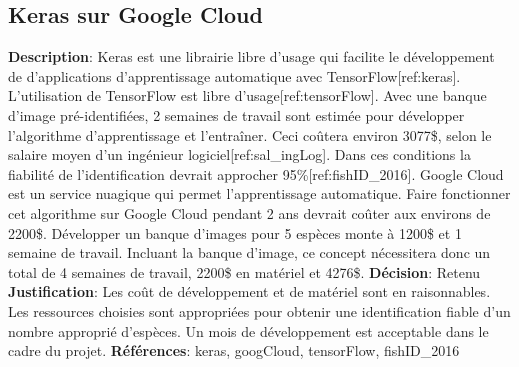 

\subsection{Keras sur Google Cloud}
\label{s:identifier_conc4}

\textbf{Description}: Keras est une librairie libre d’usage qui facilite le développement de d’applications d’apprentissage automatique avec TensorFlow[ref:keras].  L’utilisation de TensorFlow est libre d’usage[ref:tensorFlow]. Avec une banque d’image pré-identifiées, 2 semaines de travail sont estimée pour développer l'algorithme d’apprentissage et l’entraîner. Ceci coûtera environ 3077\$, selon le salaire moyen d’un ingénieur logiciel[ref:sal_ingLog]. Dans ces conditions la fiabilité de l’identification devrait approcher 95\%[ref:fishID_2016]. Google Cloud est un service nuagique qui permet l’apprentissage automatique. Faire fonctionner cet algorithme sur Google Cloud pendant 2 ans devrait coûter aux environs de 2200\$. Développer un banque d’images pour 5 espèces monte à 1200\$ et 1 semaine de travail. Incluant la banque d’image, ce concept nécessitera donc un total de 4 semaines de travail, 2200\$ en matériel et 4276\$.
\textbf{Décision}: Retenu
\textbf{Justification}: Les coût de développement et de matériel sont en raisonnables. Les ressources choisies sont appropriées pour obtenir une identification fiable d’un nombre approprié d’espèces. Un mois de développement est acceptable dans le cadre du projet.
\textbf{Références}: keras, googCloud, tensorFlow, fishID_2016